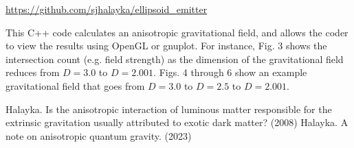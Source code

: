 \documentclass[12pt]{article}
\begin{document}
\url{https://github.com/sjhalayka/ellipsoid_emitter}

This C++ code calculates an anisotropic gravitational field, and allows the coder to view the results using OpenGL or gnuplot.
For instance, Fig. 3 shows the intersection count (e.g. field strength) as the dimension of the gravitational field reduces from $D = 3.0$ to $D = 2.001$. 
Figs. 4 through 6 show an example gravitational field that goes from $D = 3.0$ to $D = 2.5$ to $D = 2.001$.

\begin{thebibliography}{9}

 Halayka. Is the anisotropic interaction of luminous matter responsible for the extrinsic gravitation usually attributed to exotic dark matter? (2008)
 Halayka. A note on anisotropic quantum gravity. (2023)
\end{thebibliography}





\pagebreak
\end{document}
